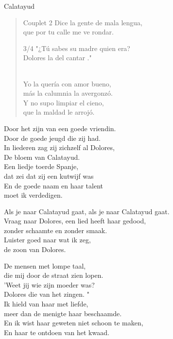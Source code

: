 \begin{song}{Calatayud}
\begin{verse}{Couplet 2}
Dice la gente de mala lengua,\\
que por tu calle me ve rondar.\hspace{1.5em}\\
\begin{sidenote}{3/4}
"¿Tú sabes su madre quien era?\\
Dolores la del cantar ."
\end{sidenote}\\
Yo la quería con amor bueno,\\
más la calumnia la avergonzó.\\
Y no supo\hspace{0.5em}\hspace{0.5em} limpiar el cieno,\\
que la maldad le arrojó.\\
\end{verse}
\end{song}

\clearpage
\begin{translation}
Door het zijn van een goede vriendin.\\
Door de goede jeugd die zij had.\\
In liederen zag zij zichzelf al Dolores,\\
De bloem van Calatayud.\\
Een liedje toerde Spanje,\\
dat zei dat zij een kutwijf was\\
En de goede naam en haar talent\\
moet ik verdedigen.\vspace{\wlskip}

Als je naar Calatayud gaat, als je naar Calatayud gaat.\\
Vraag naar Dolores, een lied heeft haar gedood,\\
zonder schaamte en zonder smaak.\\
Luister goed naar wat ik zeg,\\
de zoon van Dolores.\vspace{\wlskip}

De mensen met lompe taal,\\
die mij door de straat zien lopen.\\
'Weet jij wie zijn moeder was?\\
Dolores die van het zingen. "\\
Ik hield van haar met liefde,\\
meer dan de menigte haar beschaamde.\\
En ik wist haar geweten niet schoon te maken,\\
En haar te ontdoen van het kwaad.
\end{translation}
